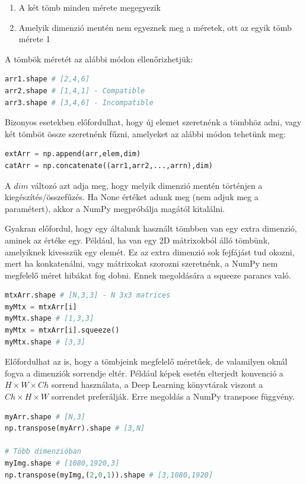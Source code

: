 \documentclass[12pt,a4paper,oneside]{report}             %
\begin{document}
\begin{enumerate}
	\item A két tömb minden mérete megegyezik
	\item Amelyik dimenzió mentén nem egyeznek meg a méretek, ott az egyik tömb mérete 1
\end{enumerate}

A tömbök méretét az alábbi módon ellenőrizhetjük:

\begin{lstlisting}[language=Python]
arr1.shape # [2,4,6]
arr2.shape # [1,4,1] - Compatible
arr3.shape # [3,4,6] - Incompatible
\end{lstlisting}

Bizonyos esetekben előfordulhat, hogy új elemet szeretnénk a tömbhöz adni, vagy két tömböt össze szeretnénk fűzni, amelyeket az alábbi módon tehetünk meg:

\begin{lstlisting}[language=Python]
extArr = np.append(arr,elem,dim)
catArr = np.concatenate((arr1,arr2,...,arrn),dim)
\end{lstlisting}

A $dim$ változó azt adja meg, hogy melyik dimenzió mentén történjen a kiegészítés/összefűzés. Ha None értéket adunk meg (nem adjuk meg a paramétert), akkor a NumPy megpróbálja magától kitalálni.

Gyakran előfordul, hogy egy általunk használt tömbben van egy extra dimenzió, aminek az értéke egy. Például, ha van egy 2D mátrixokból álló tömbünk, amelyiknek kivesszük egy elemét. Ez az extra dimenzió sok fejfájást tud okozni, mert ha konkatenálni, vagy mátrixokat szorozni szeretnénk, a NumPy nem megfelelő méret hibákat fog dobni. Ennek megoldására a squeeze parancs való.

\begin{lstlisting}[language=Python]
mtxArr.shape # [N,3,3] - N 3x3 matrices
myMtx = mtxArr[i]
myMtx.shape # [1,3,3]
myMtx = mtxArr[i].squeeze()
myMtx.shape # [3,3]
\end{lstlisting}

Előfordulhat az is, hogy a tömbjeink megfelelő méretűek, de valamilyen oknál fogva a dimenziók sorrendje eltér. Például képek esetén elterjedt konvenció a $H\times W\times Ch$ sorrend használata, a Deep Learning könyvtárak viszont a $Ch\times H\times W$ sorrendet preferálják. Erre megoldás a NumPy transpose függvény.

\begin{lstlisting}[language=Python]
myArr.shape # [N,3]
np.transpose(myArr).shape # [3,N]

# Több dimenzióban
myImg.shape # [1080,1920,3]
np.transpose(myImg,(2,0,1)).shape # [3,1080,1920]
\end{lstlisting}
\end{document}
